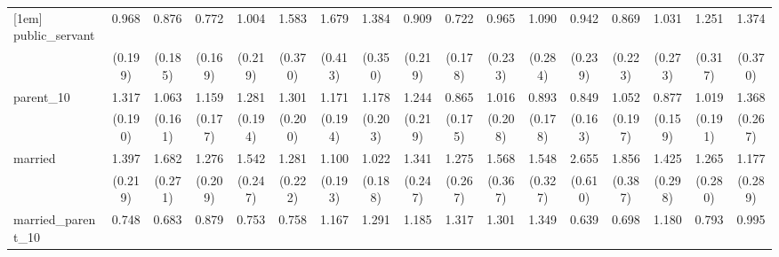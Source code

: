 {\begin{tabular}{l*{16}{c}}
[1em]
public\_servant      &       0.968         &       0.876         &       0.772         &       1.004         &       1.583\sym{*}  &       1.679\sym{*}  &       1.384         &       0.909         &       0.722         &       0.965         &       1.090         &       0.942         &       0.869         &       1.031         &       1.251         &       1.374         \\
                    &     (0.199)         &     (0.185)         &     (0.169)         &     (0.219)         &     (0.370)         &     (0.413)         &     (0.350)         &     (0.219)         &     (0.178)         &     (0.233)         &     (0.284)         &     (0.239)         &     (0.223)         &     (0.273)         &     (0.317)         &     (0.370)         \\
[1em]
parent\_10           &       1.317         &       1.063         &       1.159         &       1.281         &       1.301         &       1.171         &       1.178         &       1.244         &       0.865         &       1.016         &       0.893         &       0.849         &       1.052         &       0.877         &       1.019         &       1.368         \\
                    &     (0.190)         &     (0.161)         &     (0.177)         &     (0.194)         &     (0.200)         &     (0.194)         &     (0.203)         &     (0.219)         &     (0.175)         &     (0.208)         &     (0.178)         &     (0.163)         &     (0.197)         &     (0.159)         &     (0.191)         &     (0.267)         \\
[1em]
married             &       1.397\sym{*}  &       1.682\sym{**} &       1.276         &       1.542\sym{**} &       1.281         &       1.100         &       1.022         &       1.341         &       1.275         &       1.568         &       1.548\sym{*}  &       2.655\sym{***}&       1.856\sym{**} &       1.425         &       1.265         &       1.177         \\
                    &     (0.219)         &     (0.271)         &     (0.209)         &     (0.247)         &     (0.222)         &     (0.193)         &     (0.188)         &     (0.247)         &     (0.267)         &     (0.367)         &     (0.327)         &     (0.610)         &     (0.387)         &     (0.298)         &     (0.280)         &     (0.289)         \\
[1em]
married\_parent\_10   &       0.748         &       0.683         &       0.879         &       0.753         &       0.758         &       1.167         &       1.291         &       1.185         &       1.317         &       1.301         &       1.349         &       0.639         &       0.698         &       1.180         &       0.793         &       0.995         \\

\end{tabular}}
